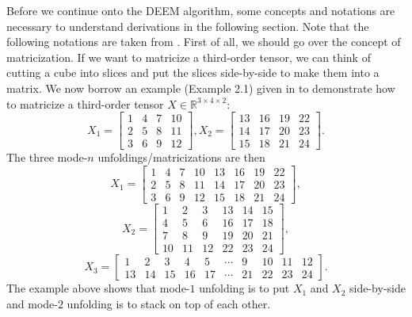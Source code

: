 \documentclass[11pt]{article}
\begin{document}
Before we continue onto the DEEM algorithm, some concepts and notations are necessary to understand derivations in the following section. Note that the following notations are taken from \cite{kolda2009review}. First of all, we should go over the concept of matricization. If we want to matricize a third-order tensor, we can think of cutting a cube into slices and put the slices side-by-side to make them into a matrix. We now borrow an example (Example 2.1) given in \cite{kolda2009review} to demonstrate how to matricize a third-order tensor $X \in \mathbb{R}^{3\times 4 \times 2}$: 
\begin{equation*}
    X_1 = \begin{bmatrix}
        1 & 4 & 7 & 10 \\ 2 & 5 & 8 & 11 \\ 3 & 6 & 9 & 12 
    \end{bmatrix}, 
    X_2 = \begin{bmatrix} 13 & 16 & 19 & 22 \\ 14 & 17 & 20 & 23 \\ 15 & 18 & 21 & 24  \end{bmatrix}.    
\end{equation*}
The three mode-$n$ unfoldings/matricizations are then
\begin{equation*}
    X_1 = \begin{bmatrix}
        1 & 4 & 7 & 10 & 13 & 16 & 19 & 22 \\ 2 & 5 & 8 & 11 & 14 & 17 & 20 & 23 \\ 3 & 6 & 9 & 12 & 15 & 18 & 21 & 24
    \end{bmatrix},
\end{equation*}
\begin{equation*}
    X_2 = \begin{bmatrix}
        1 & 2 & 3 & 13 & 14 & 15 \\ 4 & 5 & 6 & 16 & 17 & 18 \\ 7 & 8 & 9 & 19 & 20 & 21 \\ 10 & 11 & 12 & 22 & 23  & 24
    \end{bmatrix},
\end{equation*}
\begin{equation*}
    X_3 = \begin{bmatrix}
        1 & 2 & 3 & 4 & 5 & \cdots & 9 & 10 & 11 & 12 \\ 13 & 14 & 15 & 16 & 17 & \cdots & 21 & 22 & 23 & 24 
    \end{bmatrix}.
\end{equation*}
The example above shows that mode-$1$ unfolding is to put $X_1$ and $X_2$ side-by-side and mode-$2$ unfolding is to stack on top of each other. 
\end{document}
